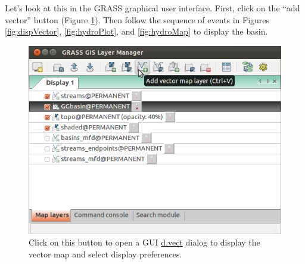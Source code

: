\documentclass{book}
\begin{document}
Let's look at this in the GRASS graphical user interface. First, click on the ``add vector'' button (Figure \ref{fig:addVector}). Then follow the sequence of events in Figures \ref{fig:dispVector}, \ref{fig:hydroPlot}, and \ref{fig:hydroMap} to display the basin.

\begin{figure}[h]
 \begin{center}
 \includegraphics[width=.9\linewidth]{figures/ubuntu/addVector.png}
 \caption{Click on this button to open a GUI \protect\url{d.vect} dialog to display the vector map and select display preferences.}
 \label{fig:addVector}
 \end{center}
\end{figure}
\end{document}
